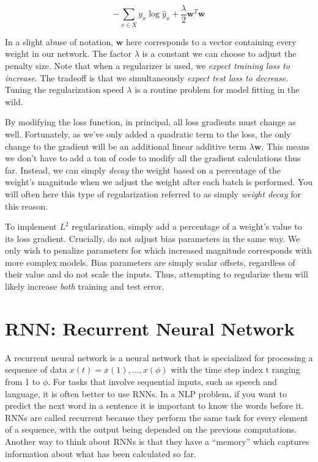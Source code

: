 \[-\sum_{x\in X} y_x \log{\hat{y}_x} + \frac{\lambda}{2} \mathbf{w}^{T}\mathbf{w}\]

In a slight abuse of notation, \(\mathbf{w}\) here corresponds to a
vector containing every weight in our network. The factor \(\lambda\) is
a constant we can choose to adjust the penalty size. Note that when a
regularizer is used, we \emph{expect training loss to increase}. The
tradeoff is that we simultaneously \emph{expect test loss to decrease}.
Tuning the regularization speed \(\lambda\) is a routine problem for
model fitting in the wild.

By modifying the loss function, in principal, all loss gradients must
change as well. Fortunately, as we've only added a quadratic term to the
loss, the only change to the gradient will be an additional linear
additive term \(\lambda\mathbf{w}\). This means we don't have to add a
ton of code to modify all the gradient calculations thus far. Instead,
we can simply \emph{decay} the weight based on a percentage of the
weight's magnitude when we adjust the weight after each batch is
performed. You will often here this type of regularization referred to
as simply \emph{weight decay} for this reason.

To implement \(L^2\) regularization, simply add a percentage of a
weight's value to its loss gradient. Crucially, do not adjust bias
parameters in the same way. We only wish to penalize parameters for
which increased magnitude corresponds with more complex models. Bias
parameters are simply scalar offsets, regardless of their value and do
not scale the inputs. Thus, attempting to regularize them will likely
increase \emph{both} training and test error.

\section{RNN: Recurrent Neural Network}

A recurrent neural network is a neural network that is specialized for processing a sequence of data $x(t)= x(1), . . . , x(\phi)$ with the time step index t ranging from 1 to $\phi$. For tasks that involve sequential inputs, such as speech and language, it is often better to use RNNs. In a NLP problem, if you want to predict the next word in a sentence it is important to know the words before it. RNNs are called recurrent because they perform the same task for every element of a sequence, with the output being depended on the previous computations. Another way to think about RNNs is that they have a “memory” which captures information about what has been calculated so far.

